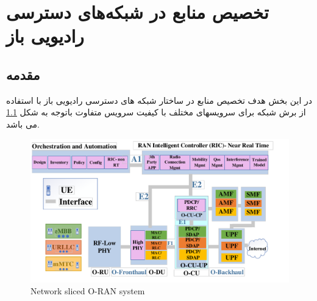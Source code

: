 \chapter{تخصیص منابع در شبکه‌های دسترسی رادیویی باز}
\section{مقدمه}
در این بخش هدف تخصیص منابع در ساختار شبکه های دسترسی رادیویی باز با استفاده از برش شبکه برای سرویسهای مختلف با کیفیت سرویس متفاوت باتوجه به شکل \ref{fig:c11} می باشد. 

\begin{figure}
  \centering
  \captionsetup{justification=centering}
    \includegraphics[scale = 0.4]{./img/finalDraw1.pdf}
  \caption{Network sliced O-RAN system}
  \label{fig:c11}
\end{figure}